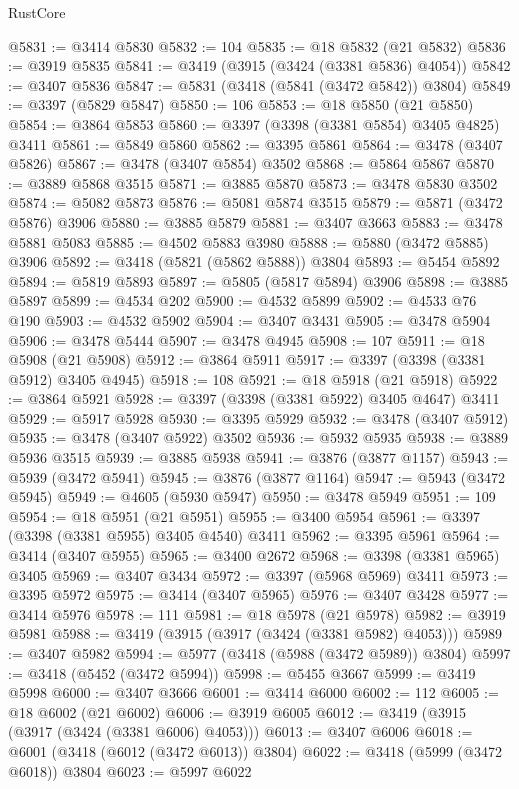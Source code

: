 \begin{lexlean}{RustCore}
\begin{coremodule}
@5831 := @3414 @5830
@5832 := 104
@5835 := @18 @5832 (@21 @5832)
@5836 := @3919 @5835
@5841 := @3419 (@3915 (@3424 (@3381 @5836) @4054))
@5842 := @3407 @5836
@5847 := @5831 (@3418 (@5841 (@3472 @5842)) @3804)
@5849 := @3397 (@5829 @5847)
@5850 := 106
@5853 := @18 @5850 (@21 @5850)
@5854 := @3864 @5853
@5860 := @3397 (@3398 (@3381 @5854) @3405 @4825) @3411
@5861 := @5849 @5860
@5862 := @3395 @5861
@5864 := @3478 (@3407 @5826)
@5867 := @3478 (@3407 @5854) @3502
@5868 := @5864 @5867
@5870 := @3889 @5868 @3515
@5871 := @3885 @5870
@5873 := @3478 @5830 @3502
@5874 := @5082 @5873
@5876 := @5081 @5874 @3515
@5879 := @5871 (@3472 @5876) @3906
@5880 := @3885 @5879
@5881 := @3407 @3663
@5883 := @3478 @5881 @5083
@5885 := @4502 @5883 @3980
@5888 := @5880 (@3472 @5885) @3906
@5892 := @3418 (@5821 (@5862 @5888)) @3804
@5893 := @5454 @5892
@5894 := @5819 @5893
@5897 := @5805 (@5817 @5894) @3906
@5898 := @3885 @5897
@5899 := @4534 @202
@5900 := @4532 @5899
@5902 := @4533 @76 @190
@5903 := @4532 @5902
@5904 := @3407 @3431
@5905 := @3478 @5904
@5906 := @3478 @5444
@5907 := @3478 @4945
@5908 := 107
@5911 := @18 @5908 (@21 @5908)
@5912 := @3864 @5911
@5917 := @3397 (@3398 (@3381 @5912) @3405 @4945)
@5918 := 108
@5921 := @18 @5918 (@21 @5918)
@5922 := @3864 @5921
@5928 := @3397 (@3398 (@3381 @5922) @3405 @4647) @3411
@5929 := @5917 @5928
@5930 := @3395 @5929
@5932 := @3478 (@3407 @5912)
@5935 := @3478 (@3407 @5922) @3502
@5936 := @5932 @5935
@5938 := @3889 @5936 @3515
@5939 := @3885 @5938
@5941 := @3876 (@3877 @1157)
@5943 := @5939 (@3472 @5941)
@5945 := @3876 (@3877 @1164)
@5947 := @5943 (@3472 @5945)
@5949 := @4605 (@5930 @5947)
@5950 := @3478 @5949
@5951 := 109
@5954 := @18 @5951 (@21 @5951)
@5955 := @3400 @5954
@5961 := @3397 (@3398 (@3381 @5955) @3405 @4540) @3411
@5962 := @3395 @5961
@5964 := @3414 (@3407 @5955)
@5965 := @3400 @2672
@5968 := @3398 (@3381 @5965) @3405
@5969 := @3407 @3434
@5972 := @3397 (@5968 @5969) @3411
@5973 := @3395 @5972
@5975 := @3414 (@3407 @5965)
@5976 := @3407 @3428
@5977 := @3414 @5976
@5978 := 111
@5981 := @18 @5978 (@21 @5978)
@5982 := @3919 @5981
@5988 := @3419 (@3915 (@3917 (@3424 (@3381 @5982) @4053)))
@5989 := @3407 @5982
@5994 := @5977 (@3418 (@5988 (@3472 @5989)) @3804)
@5997 := @3418 (@5452 (@3472 @5994))
@5998 := @5455 @3667
@5999 := @3419 @5998
@6000 := @3407 @3666
@6001 := @3414 @6000
@6002 := 112
@6005 := @18 @6002 (@21 @6002)
@6006 := @3919 @6005
@6012 := @3419 (@3915 (@3917 (@3424 (@3381 @6006) @4053)))
@6013 := @3407 @6006
@6018 := @6001 (@3418 (@6012 (@3472 @6013)) @3804)
@6022 := @3418 (@5999 (@3472 @6018)) @3804
@6023 := @5997 @6022

\end{coremodule}
\end{lexlean}
